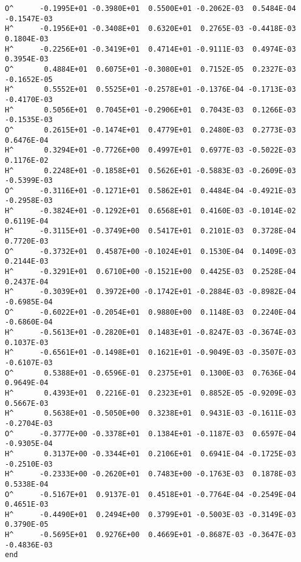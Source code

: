 \begin{verbatim}
O^      -0.1995E+01 -0.3980E+01  0.5500E+01 -0.2062E-03  0.5484E-04 -0.1547E-03
H^      -0.1956E+01 -0.3408E+01  0.6320E+01  0.2765E-03 -0.4418E-03  0.1804E-03
H^      -0.2256E+01 -0.3419E+01  0.4714E+01 -0.9111E-03  0.4974E-03  0.3954E-03
O^       0.4884E+01  0.6075E+01 -0.3080E+01  0.7152E-05  0.2327E-03 -0.1652E-05
H^       0.5552E+01  0.5525E+01 -0.2578E+01 -0.1376E-04 -0.1713E-03 -0.4170E-03
H^       0.5056E+01  0.7045E+01 -0.2906E+01  0.7043E-03  0.1266E-03 -0.1535E-03
O^       0.2615E+01 -0.1474E+01  0.4779E+01  0.2480E-03  0.2773E-03  0.6476E-04
H^       0.3294E+01 -0.7726E+00  0.4997E+01  0.6977E-03 -0.5022E-03  0.1176E-02
H^       0.2248E+01 -0.1858E+01  0.5626E+01 -0.5883E-03 -0.2609E-03 -0.5399E-03
O^      -0.3116E+01 -0.1271E+01  0.5862E+01  0.4484E-04 -0.4921E-03 -0.2958E-03
H^      -0.3824E+01 -0.1292E+01  0.6568E+01  0.4160E-03 -0.1014E-02  0.6119E-04
H^      -0.3115E+01 -0.3749E+00  0.5417E+01  0.2101E-03  0.3728E-04  0.7720E-03
O^      -0.3732E+01  0.4587E+00 -0.1024E+01  0.1530E-04  0.1409E-03  0.2144E-03
H^      -0.3291E+01  0.6710E+00 -0.1521E+00  0.4425E-03  0.2528E-04  0.2437E-04
H^      -0.3039E+01  0.3972E+00 -0.1742E+01 -0.2884E-03 -0.8982E-04 -0.6985E-04
O^      -0.6022E+01 -0.2054E+01  0.9880E+00  0.1148E-03  0.2240E-04 -0.6860E-04
H^      -0.5613E+01 -0.2820E+01  0.1483E+01 -0.8247E-03 -0.3674E-03  0.1037E-03
H^      -0.6561E+01 -0.1498E+01  0.1621E+01 -0.9049E-03 -0.3507E-03 -0.6107E-03
O^       0.5388E+01 -0.6596E-01  0.2375E+01  0.1300E-03  0.7636E-04  0.9649E-04
H^       0.4393E+01  0.2216E-01  0.2323E+01  0.8852E-05 -0.9209E-03  0.5667E-03
H^       0.5638E+01 -0.5050E+00  0.3238E+01  0.9431E-03 -0.1611E-03 -0.2704E-03
O^      -0.3777E+00 -0.3378E+01  0.1384E+01 -0.1187E-03  0.6597E-04 -0.9305E-04
H^       0.3137E+00 -0.3344E+01  0.2106E+01  0.6941E-04 -0.1725E-03 -0.2510E-03
H^      -0.2333E+00 -0.2620E+01  0.7483E+00 -0.1763E-03  0.1878E-03  0.5338E-04
O^      -0.5167E+01  0.9137E-01  0.4518E+01 -0.7764E-04 -0.2549E-04  0.4651E-03
H^      -0.4490E+01  0.2494E+00  0.3799E+01 -0.5003E-03 -0.3149E-03  0.3790E-05
H^      -0.5695E+01  0.9276E+00  0.4669E+01 -0.8687E-03 -0.3647E-03 -0.4836E-03
end
\end{verbatim}
\normalsize
